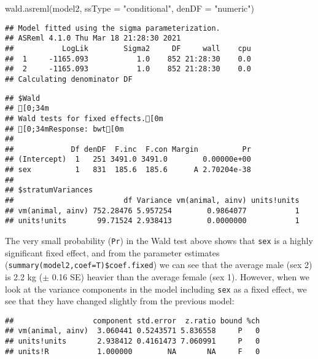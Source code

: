 \documentclass[
  12pt,
]{book}
\newenvironment{Shaded}{\begin{snugshade}}{\end{snugshade}}
\newcommand{\AttributeTok}[1]{\textcolor[rgb]{0.77,0.63,0.00}{#1}}
\newcommand{\FunctionTok}[1]{\textcolor[rgb]{0.00,0.00,0.00}{#1}}
\newcommand{\NormalTok}[1]{#1}
\newcommand{\SpecialCharTok}[1]{\textcolor[rgb]{0.00,0.00,0.00}{#1}}
\newcommand{\StringTok}[1]{\textcolor[rgb]{0.31,0.60,0.02}{#1}}
\begin{document}
\begin{Shaded}
\begin{Highlighting}[]
\FunctionTok{wald.asreml}\NormalTok{(model2, }\AttributeTok{ssType =} \StringTok{"conditional"}\NormalTok{, }\AttributeTok{denDF =} \StringTok{"numeric"}\NormalTok{)}
\end{Highlighting}
\end{Shaded}

\begin{verbatim}
## Model fitted using the sigma parameterization.
## ASReml 4.1.0 Thu Mar 18 21:28:30 2021
##           LogLik        Sigma2     DF     wall    cpu
##  1     -1165.093           1.0    852 21:28:30    0.0
##  2     -1165.093           1.0    852 21:28:30    0.0
## Calculating denominator DF
\end{verbatim}

\begin{verbatim}
## $Wald
## [0;34m
## Wald tests for fixed effects.[0m
## [0;34mResponse: bwt[0m
## 
##             Df denDF  F.inc  F.con Margin          Pr
## (Intercept)  1   251 3491.0 3491.0        0.00000e+00
## sex          1   831  185.6  185.6      A 2.70204e-38
## 
## $stratumVariances
##                         df Variance vm(animal, ainv) units!units
## vm(animal, ainv) 752.28476 5.957254        0.9864077           1
## units!units       99.71524 2.938413        0.0000000           1
\end{verbatim}

The very small probability (\texttt{Pr}) in the Wald test above shows that \texttt{sex} is a highly significant fixed effect, and from the parameter estimates (\texttt{summary(model2,coef=T)\$coef.fixed}) we can see that the average male (sex 2) is 2.2 kg (\(\pm\) 0.16 SE) heavier than the average female (sex 1). However, when we look at the variance components in the model including \texttt{sex} as a fixed effect, we see that they have changed slightly from the previous model:

\begin{Shaded}
\end{Shaded}

\begin{verbatim}
##                  component std.error  z.ratio bound %ch
## vm(animal, ainv)  3.060441 0.5243571 5.836558     P   0
## units!units       2.938412 0.4161473 7.060991     P   0
## units!R           1.000000        NA       NA     F   0
\end{verbatim}
\end{document}
